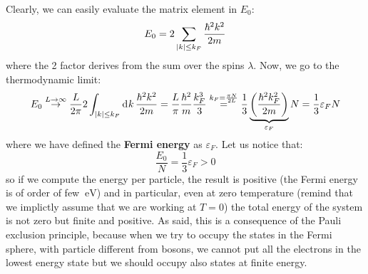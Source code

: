 \documentclass[11pt, a4paper, twoside, openright]{article}
\begin{document}
\begin{itemize}
Clearly, we can easily evaluate the matrix element in \( E_0 \):
\begin{equation*}
  E_0 = 2 \sum_{\abs{k} \le k_F }^{}  \frac{\hbar ^2 k^2}{2m}
\end{equation*}
where the 2 factor derives from the sum over the spins \( \lambda  \).
Now, we go to the thermodynamic limit:
\begin{equation}
\begin{split}
  E_0  \overset{L \rightarrow \infty }{\rightarrow } \frac{L}{2 \pi}
  2  \int_{\abs{k} \le k_F}^{} \dd[]{k} \frac{\hbar ^2 k^2}{2m}
  = \frac{L}{\pi} \frac{\hbar ^2 }{m} \frac{k_F^3}{3}
   \overset{k_F=  \frac{\pi N}{2L}}{=}
   \frac{1}{3} \underbrace{\qty(\frac{\hbar ^2 k_F^2}{2m}) }_{\varepsilon _F} N = \frac{1}{3} \varepsilon _F N
\end{split}
\end{equation}
where we have defined the \textbf{Fermi energy} as \( \varepsilon _F \).
Let us notice that:
\begin{equation*}
  \frac{E_0}{N} = \frac{1}{3} \varepsilon _F > 0
\end{equation*}
so if we compute the energy per particle, the result is positive (the Fermi energy is of order of few \( \SI{}{\eV}  \)) and in particular, even at zero temperature (remind that we implictly assume that we are working at \( T=0 \)) the total energy of the system is not zero but finite and positive.
As said, this is a consequence of the Pauli exclusion principle, because when we try to occupy the states in the Fermi sphere, with particle different from bosons, we cannot put all the electrons in the lowest energy state but we should occupy also states at finite energy.



\end{itemize}
\end{document}
